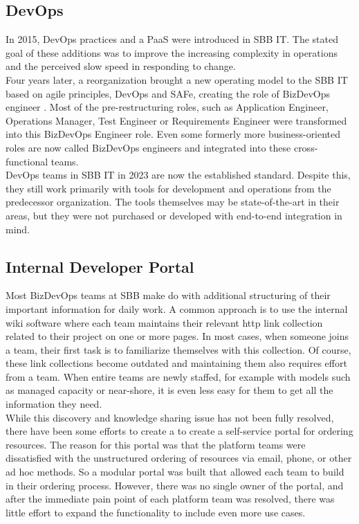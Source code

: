 \documentclass[a4paper,12pt]{article}
\begin{document}
    \subsection{DevOps}
    \label{subsec:sbbdevops}
    In 2015, DevOps practices and a PaaS were introduced in SBB IT.
    The stated goal of these additions was to improve the increasing complexity in operations and the perceived slow
    speed in responding to change\parencite{sbbdevops}.\\
    Four years later, a reorganization brought a new operating model to the SBB IT based on agile principles, DevOps and
    SAFe, creating the role of BizDevOps engineer\parencite{sbbagile} .
    Most of the pre-restructuring roles, such as Application Engineer, Operations Manager, Test Engineer or
    Requirements Engineer were transformed into this BizDevOps Engineer role.
    Even some formerly more business-oriented roles are now called BizDevOps engineers and integrated into these
    cross-functional teams.\\
    DevOps teams in SBB IT in 2023 are now the established standard.
    Despite this, they still work primarily with tools for development and operations from the predecessor organization.
    The tools themselves may be state-of-the-art in their areas, but they were not purchased or developed with
    end-to-end integration in mind.

    \subsection{Internal Developer Portal}
    \label{subsec:sbbportal}
    Most BizDevOps teams at SBB make do with additional structuring of their important information for daily work.
    A common approach is to use the internal wiki software where each team maintains their relevant http link collection
    related to their project on one or more pages.
    In most cases, when someone joins a team, their first task is to familiarize themselves with this collection.
    Of course, these link collections become outdated and maintaining them also requires effort from a team.
    When entire teams are newly staffed, for example with models such as managed capacity or near-shore, it is even less
    easy for them to get all the information they need.\\
    While this discovery and knowledge sharing issue has not been fully resolved, there have been some efforts to create
    a to create a self-service portal for ordering resources.
    The reason for this portal was that the platform teams were dissatisfied with the unstructured ordering of resources
    via email, phone, or other ad hoc methods.
    So a modular portal was built that allowed each team to build in their ordering process.
    However, there was no single owner of the portal, and after the immediate pain point of each platform team was
    resolved, there was little effort to expand the functionality to include even more use cases.
\end{document}
